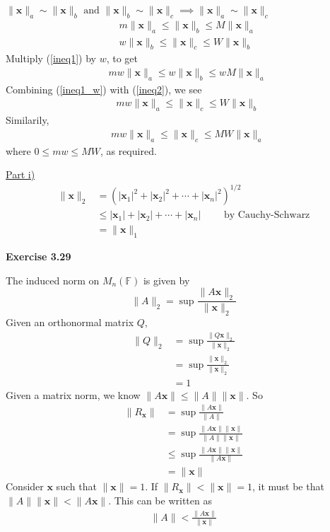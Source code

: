\documentclass[letterpaper,12pt]{article}
\newcommand{\vect}[1]{\mathbf{#1}}
\begin{document}
\underline{$ \| \vect{x} \|_a \sim \| \vect{x} \|_b \text{ and } \| \vect{x} \|_b \sim \| \vect{x} \|_c  \implies \| \vect{x} \|_a \sim \| \vect{x} \|_c$}
\begin{align}
  \label{ineq1}
  & m \| \vect{x} \|_a \leq \|\vect{x}\|_b \leq M \| \vect{x} \|_a
\\
  \label{ineq2}
  & w \| \vect{x} \|_b \leq \|\vect{x}\|_c \leq W \| \vect{x} \|_b
\end{align}
Multiply (\ref{ineq1}) by $w$, to get
\begin{align}
  \label{ineq1_w}
  & mw \| \vect{x} \|_a \leq w\|\vect{x}\|_b \leq wM \| \vect{x} \|_a
\end{align}
Combining (\ref{ineq1_w}) with (\ref{ineq2}), we see
\begin{align*}
  & mw \| \vect{x} \|_a \leq \|\vect{x}\|_c \leq W \| \vect{x} \|_b
\end{align*}
Similarily,
\begin{align*}
  & mw \| \vect{x} \|_a \leq \|\vect{x}\|_c \leq MW \| \vect{x} \|_a
\end{align*}
where $0 \leq mw \leq MW$, as required.

\underline{Part i)}
\begin{align*}
  \| \vect{x} \|_2 
  &= (|\vect{x}_1|^2 + |\vect{x}_2|^2 + \cdots + |\vect{x}_n|^2)^{1/2} \\
  & \leq |\vect{x}_1| + |\vect{x}_2| + \cdots + |\vect{x}_n| \quad \quad \text{ by Cauchy-Schwarz} \\
  &= \| \vect{x} \|_1
\end{align*}

\textbf{Exercise 3.29}

The induced norm on $M_n(\mathbb F)$ is given by
$$
\| A \|_2 = \sup \frac{\|A \vect{x} \|_2}{\| \vect{x} \|_2}
$$
Given an orthonormal matrix $Q$,
\begin{align*}
  \| Q \|_2 &= \sup \frac{\|Q \vect{x} \|_2}{\| \vect{x} \|_2} \\
  &= \sup \frac{\|\vect{x} \|_2}{\| \vect{x} \|_2} \\
  &= 1
\end{align*}
Given a matrix norm, we know $\|A \vect{x} \| \leq \|A \| \|\vect{x} \|$. So
\begin{align*}
  \|R_{\vect{x}}\| &= \sup \frac{\| A\vect{x} \|}{\|A\|} \\
  &= \sup \frac{\| A\vect{x} \| \| \vect{x} \| }{\|A\| \| \vect{x} \|} \\
  &\leq \sup \frac{\| A\vect{x} \| \| \vect{x} \| }{\|A \vect{x} \|} \\
  &= \| \vect{x} \|
\end{align*}
Consider $\vect{x}$ such that $\|\vect{x}\| = 1$.
If $\|R_{\vect{x}}\| < \|\vect{x}\| = 1$, it must be that $\|A\|\|\vect{x}\| < \|A \vect{x} \|$. This can be written as
\begin{align*}
  \| A \| < \frac{\|A \vect{x}\|}{\|\vect{x}\|}
\end{align*}
\end{document}
